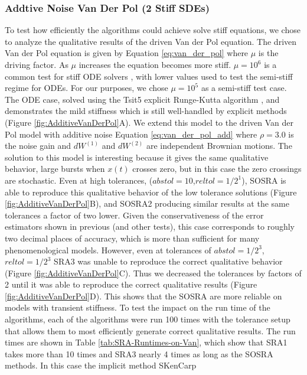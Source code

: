 \documentclass{article}
\begin{document}
\subsubsection{Addtive Noise Van Der Pol (2 Stiff SDEs)}

To test how efficiently the algorithms could achieve solve stiff equations,
we chose to analyze the qualitative results of the driven Van der
Pol equation. The driven Van der Pol equation is given by Equation
\ref{eq:van_der_pol} where $\mu$ is the driving factor. As $\mu$
increases the equation becomes more stiff. $\mu=10^{6}$ is a common
test for stiff ODE solvers \cite{RN3794}, with lower values used
to test the semi-stiff regime for ODEs. For our purposes, we chose
$\mu=10^{5}$ as a semi-stiff test case. The ODE case, solved using
the Tsit5 explicit Runge-Kutta algorithm \cite{RN3523,RN3784}, and
demonstrates the mild stiffness which is still well-handled by explicit
methods (Figure \ref{fig:AdditiveVanDerPol}A). We extend this model
to the driven Van der Pol model with additive noise Equation \ref{eq:van_der_pol_add}
where $\rho=3.0$ is the noise gain and $dW^{(1)}$ and $dW^{(2)}$
are independent Brownian motions. The solution to this model is interesting
because it gives the same qualitative behavior, large bursts when
$x(t)$ crosses zero, but in this case the zero crossings are stochastic.
Even at high tolerances, ($abstol=10$,$reltol=1/2^{1}$), SOSRA is
able to reproduce this qualitative behavior of the low tolerance solutions
(Figure \ref{fig:AdditiveVanDerPol}B), and SOSRA2 producing similar
results at the same tolerances a factor of two lower. Given the conservativeness
of the error estimators shown in previous (and other tests), this
case corresponds to roughly two decimal places of accuracy, which
is more than sufficient for many phenomenological models. However,
even at tolerances of $abstol=1/2^{3}$,$reltol=1/2^{3}$ SRA3 was
unable to reproduce the correct qualitative behavior (Figure \ref{fig:AdditiveVanDerPol}C).
Thus we decreased the tolerances by factors of 2 until it was able
to reproduce the correct qualitative results (Figure \ref{fig:AdditiveVanDerPol}D).
This shows that the SOSRA are more reliable on models with transient
stiffness. To test the impact on the run time of the algorithms, each
of the algorithms were run 100 times with the tolerance setup that
allows them to most efficiently generate correct qualitative results.
The run times are shown in Table \ref{tab:SRA-Runtimes-on-Van}, which
show that SRA1 takes more than 10 times and SRA3 nearly 4 times as
long as the SOSRA methods. In this case the implicit method SKenCarp
\end{document}
